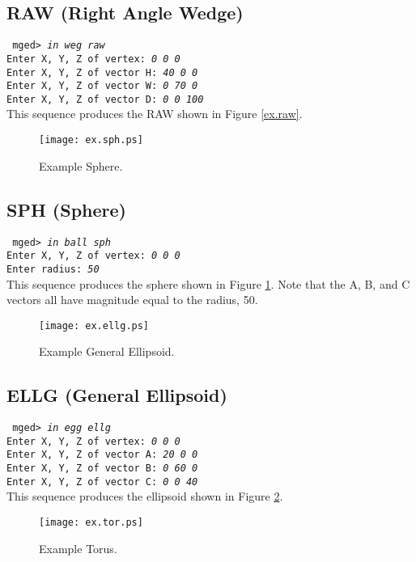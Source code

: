 \subsection{RAW (Right Angle Wedge)}

{\tt
mged> {\em in weg raw} \\
Enter X, Y, Z of vertex: {\em 0 0 0} \\
Enter X, Y, Z of vector H: {\em 40 0 0} \\
Enter X, Y, Z of vector W: {\em 0 70 0} \\
Enter X, Y, Z of vector D: {\em 0 0 100} \\
}
This sequence produces the RAW shown in Figure \ref{ex.raw}.
\begin{figure}
\centering \texttt{[image: ex.sph.ps]}
\caption{Example Sphere.}
\label{ex.sph}
\end{figure}

\subsection{SPH (Sphere)}

{\tt
mged> {\em in ball sph} \\
Enter X, Y, Z of vertex: {\em 0 0 0} \\
Enter radius: {\em 50} \\
}
This sequence produces the sphere shown in Figure \ref{ex.sph}.
Note that the A, B, and C vectors all have magnitude equal to
the radius, 50.
\begin{figure}
\centering \texttt{[image: ex.ellg.ps]}
\caption{Example General Ellipsoid.}
\label{ex.ellg}
\end{figure}

\subsection{ELLG (General Ellipsoid)}

{\tt
mged> {\em in egg ellg} \\
Enter X, Y, Z of vertex: {\em 0 0 0} \\
Enter X, Y, Z of vector A: {\em 20 0 0} \\
Enter X, Y, Z of vector B: {\em 0 60 0} \\
Enter X, Y, Z of vector C: {\em 0 0 40} \\
}
This sequence produces the ellipsoid shown in Figure \ref{ex.ellg}.
\begin{figure}
\centering \texttt{[image: ex.tor.ps]}
\caption{Example Torus.}
\label{ex.tor}
\end{figure}

